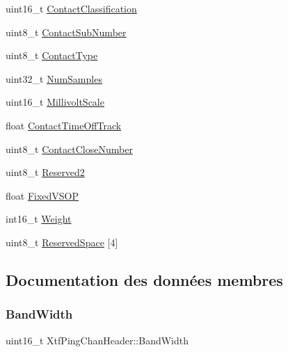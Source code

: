 \begin{DoxyCompactItemize}
\item 
uint16\+\_\+t \hyperlink{structXtfPingChanHeader_ac5295a152c2918a4a6b03716c381532b}{Contact\+Classification}
\item 
uint8\+\_\+t \hyperlink{structXtfPingChanHeader_afbbf1dcb5a945ab1d534a012fc0773d5}{Contact\+Sub\+Number}
\item 
uint8\+\_\+t \hyperlink{structXtfPingChanHeader_adbdbbb9f0ab433cabfedd9e1b36938b7}{Contact\+Type}
\item 
uint32\+\_\+t \hyperlink{structXtfPingChanHeader_a6aaaa540e66aaaddcb56e152c91a8652}{Num\+Samples}
\item 
uint16\+\_\+t \hyperlink{structXtfPingChanHeader_a969098397e500698a856a6ee0ba754f8}{Millivolt\+Scale}
\item 
float \hyperlink{structXtfPingChanHeader_ae570c68d6b2688a2aafd9650db9f0b96}{Contact\+Time\+Off\+Track}
\item 
uint8\+\_\+t \hyperlink{structXtfPingChanHeader_a38117b0c4bf9f9d29c8fb141eaa6ab42}{Contact\+Close\+Number}
\item 
uint8\+\_\+t \hyperlink{structXtfPingChanHeader_ad02669fb0f9899028661efc979734cfd}{Reserved2}
\item 
float \hyperlink{structXtfPingChanHeader_a7b52780ea2ec665924e2afedb8c47810}{Fixed\+V\+S\+OP}
\item 
int16\+\_\+t \hyperlink{structXtfPingChanHeader_a7f1b535bf81c110abea3862c6cf71e6b}{Weight}
\item 
uint8\+\_\+t \hyperlink{structXtfPingChanHeader_a56a6ea21690593dd164b0276fc988d94}{Reserved\+Space} \mbox{[}4\mbox{]}
\end{DoxyCompactItemize}


\subsection{Documentation des données membres}
\mbox{\label{structXtfPingChanHeader_a999a25f718223c0406f897570adb864f}} 
\subsubsection{\texorpdfstring{Band\+Width}{BandWidth}}
{\footnotesize\ttfamily uint16\+\_\+t Xtf\+Ping\+Chan\+Header\+::\+Band\+Width}

\mbox{\label{structXtfPingChanHeader_ab2103654e24128c1f6541de84a8b9fb6}} 
